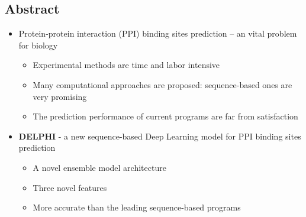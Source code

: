 \documentclass[a0,portrait]{a0poster}
\begin{document}

\begin{multicols}{2} %



\begin{mdframed}[linewidth=7pt]

\vspace*{-30pt}

\section*{\color{NavyBlue}Abstract}
\begin{itemize}
  \item Protein-protein interaction (PPI) binding sites prediction -- an vital problem for biology
  \begin{itemize}
  \item Experimental methods are time and labor intensive
  \item Many computational approaches are proposed: sequence-based ones are very promising
  \item The prediction performance of current programs are far from satisfaction
  \end{itemize}
  \item {\color{NavyBlue}\textbf{DELPHI} - a new sequence-based Deep Learning model for PPI binding sites prediction} 
  \begin{itemize}
   \item A novel ensemble model architecture
   \item Three novel features
  \item More accurate than the leading sequence-based programs
  \end{itemize}
\end{itemize}
\end{mdframed}


\end{multicols}
\end{document}
